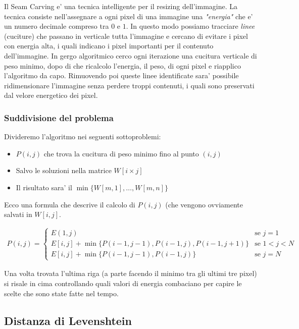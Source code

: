 \documentclass{article}
\begin{document}
Il Seam Carving e' una tecnica intelligente per il resizing dell'immagine.
La tecnica consiste nell'assegnare a ogni pixel di una immagine una \emph{"energia"}
che e' un numero decimale compreso tra $0$ e $1$. In questo modo possiamo tracciare
\emph{linee} (cuciture) che passano in verticale tutta l'immagine e cercano di evitare i pixel
con energia alta, i quali indicano i pixel importanti per il contenuto dell'immagine.
In gergo algoritmico cerco ogni iterazione una cucitura verticale di peso minimo,
dopo di che ricalcolo l'energia, il peso, di ogni pixel e riapplico l'algoritmo da capo.
Rimuovendo poi queste linee identificate sara' possibile ridimensionare l'immagine
senza perdere troppi contenuti, i quali sono preservati dal velore energetico dei pixel.

\subsubsection{Suddivisione del problema}

Divideremo l'algoritmo nei seguenti sottoproblemi:

\begin{itemize}
  \item $P(i, j)$ che trova la cucitura di peso minimo fino al punto $(i, j)$
  \item Salvo le soluzioni nella matrice $W[i \times j]$
  \item Il risultato sara' il $\min\{W[m, 1], \ldots, W[m, n]\}$
\end{itemize}

Ecco una formula che descrive il calcolo di $P(i, j)$ (che vengono ovviamente salvati
in $W[i, j]$.

\begin{align*}
  P(i, j) = \begin{cases}
    E(1, j) &\text{se } j = 1 \\
    E[i, j] + \min\{P(i-1, j-1), P(i-1, j), P(i-1, j+1)\} &\text{se } 1 < j < N \\
    E[i, j] + \min\{P(i-1, j-1), P(i-1, j)\} &\text{se } j = N
  \end{cases}
\end{align*}

Una volta trovata l'ultima riga (a parte facendo il minimo tra gli ultimi tre pixel)
si risale in cima controllando quali valori di energia combaciano per capire le
scelte che sono state fatte nel tempo.

\subsection{Distanza di Levenshtein}
\end{document}
